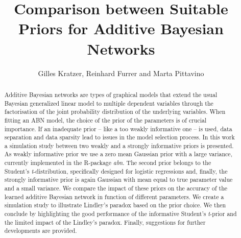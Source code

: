 \documentclass{svproc}
\begin{document}
\mainmatter              %
%
\title{Comparison between Suitable Priors for Additive Bayesian Networks}
%
%
\author{Gilles Kratzer, Reinhard Furrer and Marta Pittavino}
%
%
%



\maketitle              %

\begin{abstract}
Additive Bayesian networks  are types of graphical models that extend
 the usual Bayesian generalized linear model to multiple dependent variables through the
 factorisation of the joint probability distribution of the underlying variables.
 When fitting an ABN model, the choice of the prior of the parameters is of crucial importance.
 If an inadequate prior -- like a too weakly informative one -- is used, data separation and data sparsity lead to issues in the model selection process. In this work a simulation study between two weakly and a strongly informative priors is presented.
 As weakly informative prior we use a zero mean Gaussian prior with a large
 variance, currently implemented in the R-package \emph{abn}. The second prior belongs to the Student's \emph{t}-distribution, specifically designed for logistic regressions and, finally,  the strongly informative prior is again Gaussian with mean equal to true parameter value and a small variance. 
 We compare the impact of these priors on the accuracy of the learned additive Bayesian network in function of different parameters.
 We create a simulation study to illustrate Lindley's paradox based on the prior choice.
 We then conclude by highlighting the good performance of the informative Student's \emph{t}-prior and the limited impact of the Lindley's paradox.
 Finally, suggestions for further developments are provided.
 
\end{abstract}
% 
\end{document}
